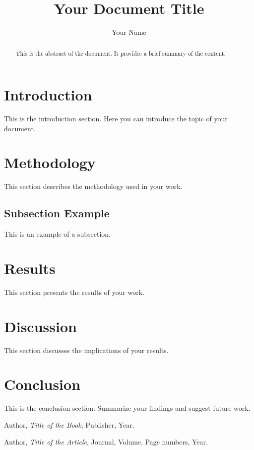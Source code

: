 \documentclass[a4paper,12pt]{article}
\title{Your Document Title}
\author{Your Name}
\begin{document}
\maketitle

\begin{abstract}
This is the abstract of the document. It provides a brief summary of the content.
\end{abstract}

\tableofcontents
\newpage

\section{Introduction}
This is the introduction section. Here you can introduce the topic of your document.

\section{Methodology}
This section describes the methodology used in your work.

\subsection{Subsection Example}
This is an example of a subsection.

\section{Results}
This section presents the results of your work.

\section{Discussion}
This section discusses the implications of your results.

\section{Conclusion}
This is the conclusion section. Summarize your findings and suggest future work.

\begin{thebibliography}{9}
Author, \textit{Title of the Book}, Publisher, Year.

Author, \textit{Title of the Article}, Journal, Volume, Page numbers, Year.
\end{thebibliography}
\end{document}
